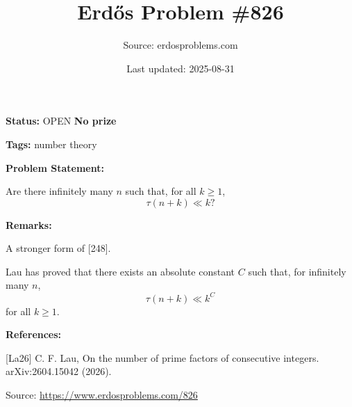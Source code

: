\documentclass{article}
\title{Erd\H{o}s Problem \#826}
\date{Last updated: 2025-08-31}
\author{Source: erdosproblems.com}
\begin{document}
\maketitle

\noindent\textbf{Status:} OPEN \quad \textbf{No prize}

\noindent\textbf{Tags:} number theory

\medskip
\noindent\textbf{Problem Statement:}

Are there infinitely many $n$ such that, for all $k\geq 1$,\[\tau(n+k)\ll k?\]

\bigskip
\noindent\textbf{Remarks:}

A stronger form of [248].

Lau \cite{La26} has proved that there exists an absolute constant $C$ such that, for infinitely many $n$,\[\tau(n+k) \ll k^C\]for all $k\geq 1$.

\bigskip
\noindent\textbf{References:}

[La26] C. F. Lau, On the number of prime factors of consecutive integers. arXiv:2604.15042 (2026).

\bigskip
\noindent\small{Source: \url{https://www.erdosproblems.com/826}}
\end{document}
